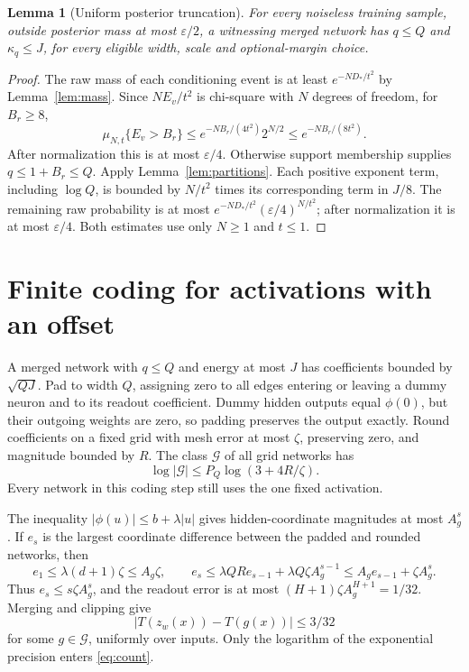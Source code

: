 \documentclass[11pt]{article}
\newtheorem{lemma}[theorem]{Lemma}
\begin{document}
\begin{lemma}[Uniform posterior truncation]\label{lem:truncation}
For every noiseless training sample, outside posterior mass at most
$\varepsilon/2$, a witnessing merged network has $q\le Q$ and
$\kappa_q\le J$, for every eligible width, scale and optional-margin choice.
\end{lemma}
\begin{proof}
The raw mass of each conditioning event is at least $e^{-ND_*/t^2}$ by
Lemma~\ref{lem:mass}. Since $NE_v/t^2$ is chi-square with $N$ degrees of
freedom, for $B_{r}\ge8$,
\[
 \mu_{N,t}\{E_v>B_{r}\}
 \le e^{-NB_{r}/(4t^2)}2^{N/2}
 \le e^{-NB_{r}/(8t^2)}.
\]
After normalization this is at most $\varepsilon/4$. Otherwise support
membership supplies $q\le1+B_{r}\le Q$.
Apply Lemma~\ref{lem:partitions}. Each positive exponent term, including
$\log Q$, is bounded by $N/t^2$ times its corresponding term in $J/8$.
The remaining raw probability is at most
$e^{-ND_*/t^2}(\varepsilon/4)^{N/t^2}$; after normalization it is at most
$\varepsilon/4$. Both estimates use only $N\ge1$ and $t\le1$.
\end{proof}

\section{Finite coding for activations with an offset}
A merged network with $q\le Q$ and energy at most $J$ has coefficients
bounded by $\sqrt{QJ}$. Pad to width $Q$, assigning zero to all edges
entering or leaving a dummy neuron and to its readout coefficient.
Dummy hidden outputs equal $\phi(0)$, but their outgoing weights are zero,
so padding preserves the output exactly.
Round coefficients on a fixed grid with mesh error at most $\zeta$,
preserving zero, and magnitude bounded by $R$. The class $\mathcal G$
of all grid networks has
\begin{equation}\label{eq:count}
 \log|\mathcal G|\le P_Q\log(3+4R/\zeta).
\end{equation}
Every network in this coding step still uses the one fixed activation.

The inequality $|\phi(u)|\le b+\lambda|u|$ gives hidden-coordinate
magnitudes at most $A_g^s$. If $e_s$ is the largest coordinate difference
between the padded and rounded networks, then
\[
 e_1\le\lambda(d+1)\zeta\le A_g\zeta,\qquad
 e_s\le\lambda QR e_{s-1}+\lambda Q\zeta A_g^{s-1}
      \le A_g e_{s-1}+\zeta A_g^s.
\]
Thus $e_s\le s\zeta A_g^s$, and the readout error is at most
$(H+1)\zeta A_g^{H+1}=1/32$. Merging and clipping give
\begin{equation}\label{eq:approx}
 |T(z_w(x))-T(g(x))|\le3/32
\end{equation}
for some $g\in\mathcal G$, uniformly over inputs. Only the logarithm of
the exponential precision enters \eqref{eq:count}.
\end{document}
